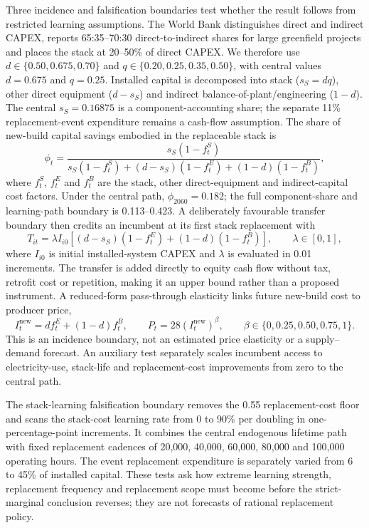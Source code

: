 \documentclass[lineno,pdflatex,sn-nature]{sn-jnl}
\begin{document}
Three incidence and falsification boundaries test whether the result follows from restricted learning assumptions. The World Bank distinguishes direct and indirect CAPEX, reports 65:35--70:30 direct-to-indirect shares for large greenfield projects and places the stack at 20--50\% of direct CAPEX\cite{worldbank2026}. We therefore use $d\in\{0.50,0.675,0.70\}$ and $q\in\{0.20,0.25,0.35,0.50\}$, with central values $d=0.675$ and $q=0.25$. Installed capital is decomposed into stack ($s_S=dq$), other direct equipment ($d-s_S$) and indirect balance-of-plant/engineering ($1-d$). The central $s_S=0.16875$ is a component-accounting share; the separate 11\% replacement-event expenditure remains a cash-flow assumption. The share of new-build capital savings embodied in the replaceable stack is
\begin{equation}
\phi_t=\frac{s_S(1-f^S_t)}{s_S(1-f^S_t)+(d-s_S)(1-f^E_t)+(1-d)(1-f^B_t)},
\label{eq:incidence}
\end{equation}
where $f^S_t$, $f^E_t$ and $f^B_t$ are the stack, other direct-equipment and indirect-capital cost factors. Under the central path, $\phi_{2060}=0.182$; the full component-share and learning-path boundary is 0.113--0.423. A deliberately favourable transfer boundary then credits an incumbent at its first stack replacement with
\begin{equation}
T_{it}=\lambda I_{i0}\left[(d-s_S)(1-f^E_t)+(1-d)(1-f^B_t)\right],
\qquad \lambda\in[0,1],
\label{eq:transfer}
\end{equation}
where $I_{i0}$ is initial installed-system CAPEX and $\lambda$ is evaluated in 0.01 increments. The transfer is added directly to equity cash flow without tax, retrofit cost or repetition, making it an upper bound rather than a proposed instrument. A reduced-form pass-through elasticity links future new-build cost to producer price,
\begin{equation}
I_t^{\mathrm{new}}=d f_t^E+(1-d)f_t^B,
\qquad P_t=28\left(I_t^{\mathrm{new}}\right)^\beta,
\qquad \beta\in\{0,0.25,0.50,0.75,1\}.
\label{eq:passthrough}
\end{equation}
This is an incidence boundary, not an estimated price elasticity or a supply--demand forecast. An auxiliary test separately scales incumbent access to electricity-use, stack-life and replacement-cost improvements from zero to the central path.

The stack-learning falsification boundary removes the 0.55 replacement-cost floor and scans the stack-cost learning rate from 0 to 90\% per doubling in one-percentage-point increments. It combines the central endogenous lifetime path with fixed replacement cadences of 20,000, 40,000, 60,000, 80,000 and 100,000 operating hours. The event replacement expenditure is separately varied from 6 to 45\% of installed capital. These tests ask how extreme learning strength, replacement frequency and replacement scope must become before the strict-marginal conclusion reverses; they are not forecasts of rational replacement policy.
\end{document}
